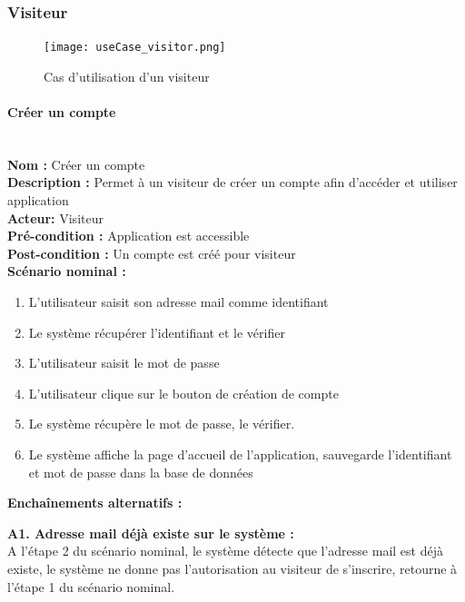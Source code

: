 \documentclass[12pt]{article}
\begin{document}
\subsubsection{Visiteur}
\begin{figure}[H]
    \centering
    \texttt{[image: useCase\_visitor.png]}
    \caption{Cas d'utilisation d'un visiteur}
    \label{fig:useCas_visitor}
\end{figure}
\paragraph{Créer un compte}
\leavevmode
\\
\textbf{Nom :} Créer un compte\\
\textbf{Description :} Permet à un visiteur de créer un compte afin d'accéder et utiliser application \\
\textbf{Acteur: } Visiteur\\
\textbf{Pré-condition : } Application est accessible \\
\textbf{Post-condition : } Un compte est créé pour visiteur\\
\textbf{Scénario nominal : }
\begin{enumerate}
    \item L'utilisateur saisit son adresse mail comme identifiant
    \item Le système récupérer l'identifiant et le vérifier
    \item L'utilisateur saisit le mot de passe
    \item L'utilisateur clique sur le bouton de création de compte
    \item Le système récupère le mot de passe, le vérifier.
    \item Le système affiche la page d'accueil de l'application, sauvegarde l'identifiant et mot de passe dans la base de données
\end{enumerate}

\textbf{Enchaînements alternatifs : }
\begin{description}
    \item \textbf{A1. Adresse mail déjà existe sur le système : }\\
    A l'étape 2 du scénario nominal, le système détecte que l'adresse mail est déjà existe, le système ne donne pas l'autorisation au visiteur de s'inscrire, retourne à l'étape 1 du scénario nominal.   
\end{description}
\end{document}
